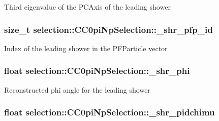 Third eigenvalue of the P\-C\-Axis of the leading shower \hypertarget{classselection_1_1CC0piNpSelection_a21f98860ef8bd0ad8d8e029a47ef6f1e}{
\subsubsection[{\-\_\-shr\-\_\-pfp\-\_\-id}]{\setlength{\rightskip}{0pt plus 5cm}size\-\_\-t selection\-::\-C\-C0pi\-Np\-Selection\-::\-\_\-shr\-\_\-pfp\-\_\-id\hspace{0.3cm}{\ttfamily [private]}}}\label{classselection_1_1CC0piNpSelection_a21f98860ef8bd0ad8d8e029a47ef6f1e}
Index of the leading shower in the P\-F\-Particle vector \hypertarget{classselection_1_1CC0piNpSelection_a8706a83b3dc2e2c3857ada556392f16f}{
\subsubsection[{\-\_\-shr\-\_\-phi}]{\setlength{\rightskip}{0pt plus 5cm}float selection\-::\-C\-C0pi\-Np\-Selection\-::\-\_\-shr\-\_\-phi\hspace{0.3cm}{\ttfamily [private]}}}\label{classselection_1_1CC0piNpSelection_a8706a83b3dc2e2c3857ada556392f16f}
Reconstructed phi angle for the leading shower \hypertarget{classselection_1_1CC0piNpSelection_a63840908c268c89d30e6728ac6cb1036}{
\subsubsection[{\-\_\-shr\-\_\-pidchimu}]{\setlength{\rightskip}{0pt plus 5cm}float selection\-::\-C\-C0pi\-Np\-Selection\-::\-\_\-shr\-\_\-pidchimu\hspace{0.3cm}{\ttfamily [private]}}}\label{classselection_1_1CC0piNpSelection_a63840908c268c89d30e6728ac6cb1036}
